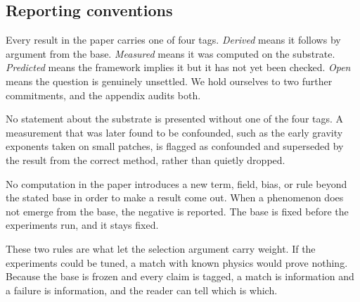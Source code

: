 \subsection{Reporting conventions}

Every result in the paper carries one of four tags. \emph{Derived} means it follows by argument from the base.
\emph{Measured} means it was computed on the substrate. \emph{Predicted} means the framework implies it but it has
not yet been checked. \emph{Open} means the question is genuinely unsettled. We hold ourselves to two further
commitments, and the appendix audits both.

\begin{principle}
No statement about the substrate is presented without one of the four tags. A measurement that was later found to
be confounded, such as the early gravity exponents taken on small patches, is flagged as confounded and
superseded by the result from the correct method, rather than quietly dropped.
\end{principle}

\begin{principle}
No computation in the paper introduces a new term, field, bias, or rule beyond the stated base in order to make a
result come out. When a phenomenon does not emerge from the base, the negative is reported. The base is
fixed before the experiments run, and it stays fixed.
\end{principle}

These two rules are what let the selection argument carry weight. If the experiments could be tuned, a match
with known physics would prove nothing. Because the base is frozen and every claim is tagged, a match is
information and a failure is information, and the reader can tell which is which.
